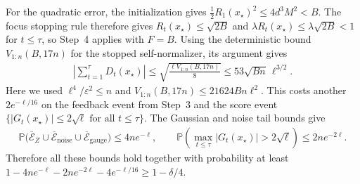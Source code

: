 \documentclass{article}
\newcommand{\Pp}{\mathbb P}
\newcommand{\1}{\mathbf 1}
\newcommand{\eps}{\varepsilon}
\begin{document}
For the quadratic error, the initialization gives
$\frac12R_1(x_\star)^2\leq4d^3M^2<B$.
The focus stopping rule therefore gives
$R_t(x_\star)\leq\sqrt{2B}$ and
$\lambda R_t(x_\star)\leq\lambda\sqrt{2B}<1$ for $t\leq\tau$,
so Step~4 applies with $F=B$.
Using the deterministic bound $V_{1:n}(B,17n)$ for the stopped
self-normalizer, its argument gives
\begin{align}
    \left|\sum_{t=1}^{\tau}D_t(x_\star)\right|
    \leq\sqrt{\frac{\ell V_{1:n}(B,17n)}8}
    \leq53\sqrt{Bn}\,\ell^{3/2}.
    \label{eq:global-quadratic-error}
\end{align}
Here we used $\ell^4/\eps^2\leq n$ and
$V_{1:n}(B,17n)\leq21624Bn\ell^2$.
This costs another $2e^{-\ell/16}$ on the feedback event from Step~3
and the score event $\{|G_t(x_\star)|\leq2\sqrt\ell\text{ for all }t\leq\tau\}$.
The Gaussian and noise tail bounds give
\begin{align}
    \Pp\bigl(\overline{\mathcal E}_Z\cup
    \overline{\mathcal E}_{\mathrm{noise}}\cup
    \overline{\mathcal E}_{\mathrm{gauge}}\bigr)
    \leq4ne^{-\ell},
    \qquad
    \Pp\left(\max_{t\leq\tau}|G_t(x_\star)|>2\sqrt\ell\right)
    \leq2ne^{-2\ell}.
\end{align}
Therefore all these bounds hold together with probability at least
$1-4ne^{-\ell}-2ne^{-2\ell}-4e^{-\ell/16}\geq1-\delta/4$.
\end{document}
